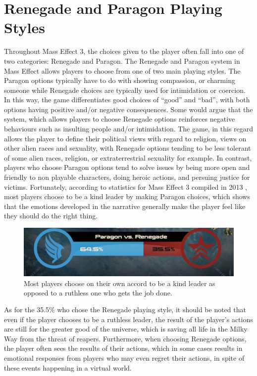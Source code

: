 \documentclass[journal]{IEEEtran}
\begin{document}
\section{Renegade and Paragon Playing Styles}
Throughout Mass Effect 3, the choices given to the player often fall into one
of two categories: Renegade and Paragon. The Renegade and Paragon system in
Mass Effect allows players to choose from one of two main playing styles.
The Paragon options typically have to do with showing compassion, or charming someone while Renegade choices are typically used for intimidation or coercion.
In this way, the game differentiates good choices of ``good'' and ``bad'',
with both options having positive and/or negative consequences.
Some would argue that the system, which allows players to choose Renegade options reinforces negative behaviours such as insulting people and/or intimidation. The game, in this regard allows the player to define their political views with regard to religion, views on other alien races
and sexuality, with Renegade options tending to be less tolerant of some
alien races, religion, or extraterrestrial sexuality for example.
In contrast, players who choose Paragon options tend to solve issues by being more open and friendly to non playable characters, doing heroic actions, and
persuing justice for  victims. Fortunately, according to
statistics for Mass Effect 3 compiled in 2013 \cite{ea}, most players choose
to be a kind leader by making Paragon choices, which shows that the emotions
developed in the narrative generally make the player feel like they should
do the right thing.

\begin{figure}[h!]
 \centering
 \includegraphics[width=.485\textwidth]{paragon}
 \caption{Most players choose on their own accord to be a kind leader as opposed to a ruthless one who gets the job done. \cite{ea}}
\end{figure}

As for the 35.5\% who chose the Renegade playing style, it should be noted that even if the player chooses to be a ruthless leader, the result of the player's actions are still for the greater good of the universe, which is saving
all life in the Milky Way from the threat of reapers. Furthermore, when choosing Renegade options, the player often sees the results of their actions,
which in some cases results in emotional responses from players who may even regret their actions, in spite of these events happening in a virtual world.
\end{document}
